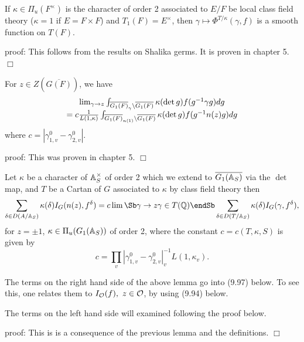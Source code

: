 \begin{lemma} If $\kappa\in \Pi_u(F^\times)$ is the character
of order 2
associated to $E/F$ be local class field theory ($\kappa =1$
if $E=F\times F$) and $T_1(F)=E^\times$, then
$\gamma\longmapsto \Phi^{T/\kappa}(\gamma,f)$ is a smooth function on
$T(F)$.
\end{lemma}

proof: This follows from the results on Shalika germs. It is proven
in chapter 5. $\Box$

\begin{lemma} For $z\in Z(\overline{G(F)})$, we have
\[
\begin{array}{c}
\lim_{\gamma\rightarrow z}
\int_{\overline{G_1(F)}_\gamma\backslash \overline{G_1(F)}}
\kappa(\det{g})f(g^{-1}\gamma g)dg\\
=c{1\over L(1,\kappa)}
\int_{\overline{G_1(F)}_{n(1)}\backslash \overline{G_1(F)}}
\kappa(\det{g})f(g^{-1}n(z) g)dg
\end{array}
\]
where $c=|\gamma_{1,v}^0-\gamma_{2,v}^0|$.
\end{lemma} 

proof: This was proven in chapter 5. $\Box$

\begin{lemma} Let $\kappa$ be a character of
${\Bbb{A}}_S^\times $ of order 2 which we extend to
$\overline{G_1({\Bbb{A}}_S)}$ via the $\det$ map,
and $T$ be a Cartan of $G$ associated to $\kappa$ by class field
theory then
\begin{equation}
\sum_{\delta\in D(A/{\Bbb{A}}_S)}
\kappa(\delta)I_G(n(z),f^\delta)
=c
\lim\Sb \gamma\rightarrow z \\ \gamma\in T({\Bbb{Q}})\endSb
\sum_{\delta\in D(T/{\Bbb{A}}_S)}
\kappa(\delta)I_G (\gamma, f^\delta),
\end{equation}
for $z =\pm 1$, $\kappa \in \Pi _u(G_1({\Bbb{A}}_S))$ of order 2,
where the constant $c=c(T,\kappa,S)$ is given by
\[
c=\prod_v |\gamma_{1,v}^0-\gamma_{2,v}^0|_v^{-1}L(1,\kappa_v) .
\]
\end{lemma}

\begin{remark} The terms on the right hand side of the above
lemma go into (9.97) below. To see this, one relates them to
$I_{\cal{O}}(f),\ z\in {\cal{O}}$, by using (9.94) below.

The terms on the left hand side will examined following the proof
below.
\end{remark}

proof: This is is a consequence of the previous lemma and the
definitions. $\Box$

